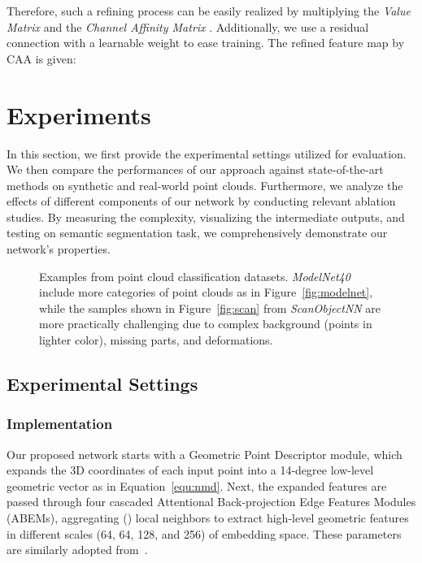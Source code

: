 \documentclass[journal,twoside]{IEEEtran}
\begin{document}
Therefore, such a refining process can be easily realized by multiplying the \emph{Value Matrix}  and the \emph{Channel Affinity Matrix} . Additionally, we use a residual connection with a learnable weight  to ease training. The refined feature map by CAA is given:


\section{Experiments}
\label{sec:exp}
In this section, we first provide the experimental settings utilized for evaluation. We then compare the performances of our approach against state-of-the-art methods on synthetic and real-world point clouds. Furthermore, we analyze the effects of different components of our network by conducting relevant ablation studies. By measuring the complexity, visualizing the intermediate outputs, and testing on semantic segmentation task, we comprehensively demonstrate our network's properties.

\begin{figure*}
\begin{center}
\end{center}
  \caption{Examples from point cloud classification datasets. \emph{ModelNet40} include more categories of point clouds as in Figure~\ref{fig:modelnet}, while the samples shown in Figure~\ref{fig:scan} from \emph{ScanObjectNN} are more practically challenging due to complex background (points in lighter color), missing parts, and deformations. }
\label{fig:examples}
\end{figure*}
\subsection{Experimental Settings}
\subsubsection{Implementation}
Our proposed network starts with a Geometric Point Descriptor module, which expands the 3D coordinates of each input point into a 14-degree low-level geometric vector as in Equation~\ref{equ:nmd}. Next, the expanded features are passed through four cascaded Attentional Back-projection Edge Features Modules (ABEMs), aggregating () local neighbors to extract high-level geometric features in different scales (64, 64, 128, and 256) of embedding space. These parameters are similarly adopted from~\cite{wang2019dynamic,liu2019relation,qi2017pointnet,qi2017pointnet++}.
\end{document}
